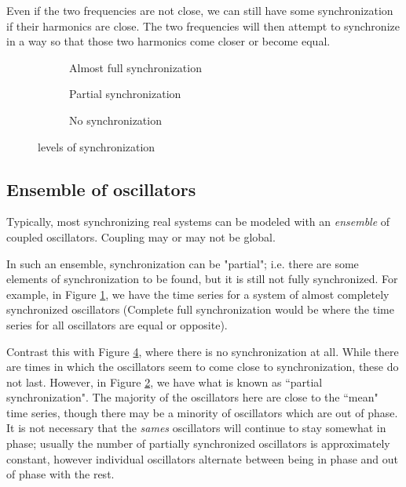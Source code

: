\documentclass[12pt]{article}
\begin{document}
Even if the two frequencies are not close, we can still have some synchronization if their harmonics are close. The two frequencies will then attempt to synchronize in a way so that those two harmonics come closer or become equal.
\begin{figure}
\centering
\begin{subfigure}[b]{0.4\textwidth}
\centering

\caption{Almost full synchronization}\label{fig:fullgraph}
\end{subfigure}
\begin{subfigure}[b]{0.4\textwidth}
\centering

\caption{Partial synchronization}\label{fig:partialgraph}
\end{subfigure}

\centering
\begin{subfigure}[b]{0.4\textwidth}
\centering

\caption{No synchronization}\label{fig:nograph}
\end{subfigure}
\caption{levels of synchronization}
\end{figure}

\subsection{Ensemble of oscillators}

Typically, most synchronizing real systems can be modeled with an \emph{ensemble} of coupled oscillators. Coupling may or may not be global.


In such an ensemble, synchronization can be "partial"; i.e. there are some elements of synchronization to be found, but it is still not fully synchronized. For example, in Figure \ref{fig:fullgraph}, we have the time series for a system of almost completely synchronized oscillators (Complete full synchronization would be where the time series for all oscillators are equal or opposite).

Contrast this with Figure \ref{fig:nograph}, where there is no synchronization at all. While there are times in which the oscillators seem to come close to synchronization, these do not last. However, in Figure \ref{fig:partialgraph}, we have what is known as ``partial synchronization". The majority of the oscillators here are close to the ``mean" time
 series, though there may be a minority of oscillators which are out of phase. It is not necessary that the \emph{sames} oscillators will continue to stay somewhat in phase; usually the number of partially synchronized oscillators is approximately constant, however individual oscillators alternate between being in phase and out of phase with the rest.
\end{document}
